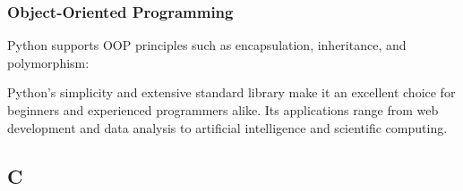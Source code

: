 \hypertarget{object-oriented-programming}{%
\subsubsection{Object-Oriented
Programming}\label{object-oriented-programming}}

Python supports OOP principles such as encapsulation, inheritance, and
polymorphism:

\begin{Shaded}
\begin{Highlighting}[]
     \NormalTok{(}
        \OperatorTok{=}

    \NormalTok{):}

    \NormalTok{):}
         \SpecialCharTok{\{}\SpecialCharTok{\}}

    \NormalTok{):}
         \SpecialCharTok{\{}\SpecialCharTok{\}}

\OperatorTok{=}\NormalTok{)}
\OperatorTok{=}\NormalTok{)}

\end{Highlighting}
\end{Shaded}

Python's simplicity and extensive standard library make it an excellent
choice for beginners and experienced programmers alike. Its applications
range from web development and data analysis to artificial intelligence
and scientific computing.

\hypertarget{c}{%
\subsection{C}\label{c}}


